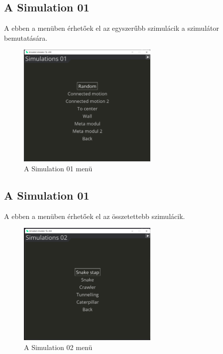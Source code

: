 \documentclass[	
  noindent
]{elteikthesis}[2024/04/26]
\begin{document}
        \subsection{A Simulation 01}
        A ebben a menüben érhetőek el az egyszerűbb szimulácik a szimulátor bemutatására.

        \begin{figure}[H]
          \centering
          \includegraphics[width=0.6\textwidth]{images/simulatons/Simulation01.png}
          \caption{A Simulation 01 menü}
          \label{fig:Simulation01}
        \end{figure}

        \subsection{A Simulation 01}
        A ebben a menüben érhetőek el az összetettebb szimulácik.

        \begin{figure}[H]
          \centering
          \includegraphics[width=0.6\textwidth]{images/simulatons/Simulation02.png}
          \caption{A Simulation 02 menü}
          \label{fig:Simulation01}
        \end{figure}
\end{document}
